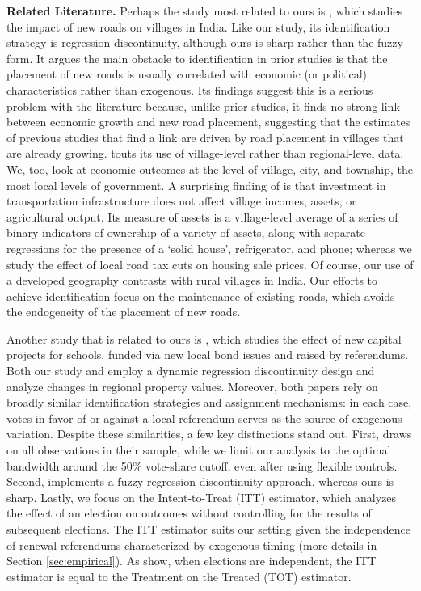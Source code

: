 {\bf Related Literature.} Perhaps the study most related to ours is \cite{asher2020}, which studies the impact of new roads on villages in India. Like our study, its identification strategy is regression discontinuity, although ours is sharp rather than the fuzzy form.  It argues the main obstacle to identification in prior studies is that the placement of new roads is usually correlated with economic (or political) characteristics rather than exogenous. Its findings suggest this is a serious problem with the literature because, unlike prior studies, it finds no strong link between economic growth and new road placement, suggesting that the estimates of previous studies that find a link are driven by road placement in villages that are already growing. \cite{asher2020} touts its use of village-level rather than regional-level data.  We, too, look at economic outcomes at the level of village, city, and township, the most local levels of government.  A surprising finding of \cite{asher2020} is that investment in transportation infrastructure does not affect village incomes, assets, or agricultural output.  Its measure of assets is a village-level average of a series of binary indicators of ownership of a variety of assets, along with separate regressions for the presence of a ‘solid house’, refrigerator, and phone; whereas we study the effect of local road tax cuts on housing sale prices.  Of course, our use of a developed geography contrasts with rural villages in India.  Our efforts to achieve identification focus on the maintenance of existing roads, which avoids the endogeneity of the placement of new roads.

Another study that is related to ours is \cite{cellini2010value}, which studies the effect of new capital projects for schools, funded via new local bond issues and raised by referendums. Both our study and \cite{cellini2010value} employ a dynamic regression discontinuity design and analyze changes in regional property values. Moreover, both papers rely on broadly similar identification strategies and assignment mechanisms: in each case, votes in favor of or against a local referendum serves as the source of exogenous variation. Despite these similarities, a few key distinctions stand out. First, \cite{cellini2010value} draws on all observations in their sample, while we limit our analysis to the optimal bandwidth around the 50\% vote-share cutoff, even after using flexible controls. Second, \cite{cellini2010value} implements a fuzzy regression discontinuity approach, whereas ours is sharp. Lastly, we focus on the Intent-to-Treat (ITT) estimator, which analyzes the effect of an election on outcomes without controlling for the results of subsequent elections. The ITT estimator suits our setting given the independence of renewal referendums characterized by exogenous timing (more details in Section \ref{sec:empirical}). As \cite{cellini2010value} show, when elections are independent, the ITT estimator is equal to the Treatment on the Treated (TOT) estimator. 

